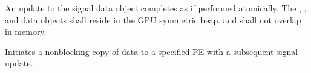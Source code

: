\begin{apidefinition}
{An update to the  signal data object completes as if performed
atomically. The , , and  data objects shall
reside in the \ac{GPU} symmetric heap.  and  shall not
overlap in memory.
}


\end{apidefinition}

\label{subsec:gc_put_signal_nbi}

Initiates a nonblocking copy of data to a specified \ac{PE} with a subsequent
signal update.

